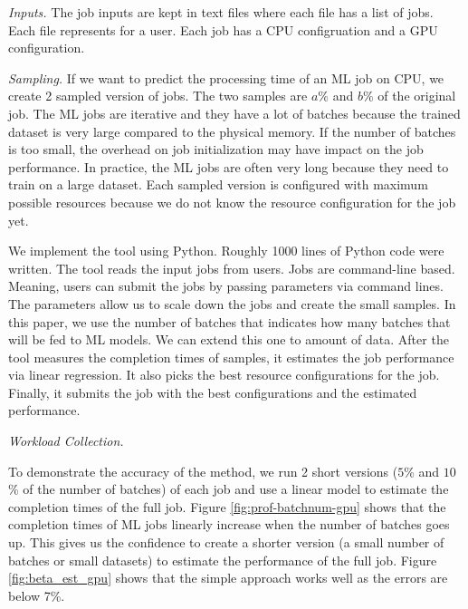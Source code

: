 
\emph{Inputs.} The job inputs are kept in text files where each file has a list of jobs.
Each file represents for a user.
Each job has a CPU configruation and a GPU configuration.

\emph{Sampling.} If we want to predict the processing time of an ML job on CPU, we create 2 sampled version of jobs.
The two samples are $a\%$ and $b\%$ of the original job.
The ML jobs are iterative and they have a lot of batches because the trained dataset is very large compared to the physical memory.
If the number of batches is too small, the overhead on job initialization may have impact on the job performance.
In practice, the ML jobs are often very long because they need to train on a large dataset.
Each sampled version is configured with maximum possible resources because we do not know the resource configuration for the job yet.

We implement the tool using Python.
Roughly 1000 lines of Python code were written.
The tool reads the input jobs from users.
Jobs are command-line based.
Meaning, users can submit the jobs by passing parameters via command lines.
The parameters allow us to scale down the jobs and create the small samples.
In this paper, we use the number of batches that indicates how many batches that will be fed to ML models.
We can extend this one to amount of data.
After the tool measures the completion times of samples, it estimates the job performance via linear regression.
It also picks the best resource configurations for the job.
Finally, it submits the job with the best configurations and the estimated performance.

\emph{Workload Collection.} 


To demonstrate the accuracy of the method,
we run 2 short versions ($5$\% and $10$\% of the number of batches) of each job and use a linear model to estimate the completion times of the full job.
Figure \ref{fig:prof-batchnum-gpu} shows that the completion times of ML jobs linearly increase when the number of batches goes up.
This gives us the confidence to create a shorter version (a small number of batches or small datasets) to estimate the performance of the full job.
Figure \ref{fig:beta_est_gpu} shows that the simple approach works well as the errors are below 7\%.

